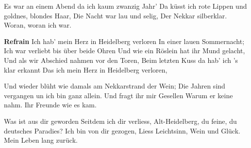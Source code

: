 \footnotemark [
ititle={Ich hab' mein Herz in Heidelberg verloren}]


\beginverse
Es war an einem Abend da ich kaum zwanzig Jahr'
Da küsst ich rote Lippen und goldnes, blondes Haar,
Die Nacht war lau und selig,
Der Nekkar silberklar.
Woran, woran ich war.
\endverse

\beginchorus
\textbf{Refrain}
Ich hab' mein Herz in Heidelberg verloren
In einer lauen Sommernacht;
Ich war verliebt bis über beide Ohren
Und wie ein Röslein hat ihr Mund gelacht,
Und als wir Abschied nahmen vor den Toren,
Beim letzten Kuss da hab' ich 's klar erkannt
Das ich mein Herz in Heidelberg verloren,
\endchorus

\beginverse
Und wieder blüht wie damals am Nekkarstrand der Wein;
Die Jahren sind vergangen un ich bin ganz allein.
Und fragt ihr mir Gesellen
Warum er keine nahm.
Ihr Freunde wie es kam.
\endverse

\beginverse
Was ist aus dir geworden Seitdem ich dir verliess,
Alt-Heidelberg, du feine, du deutsches Paradies?
Ich bin von dir gezogen,
Liess Leichtsinn, Wein und Glück.
Mein Leben lang zurück.
\endverse
\endsong